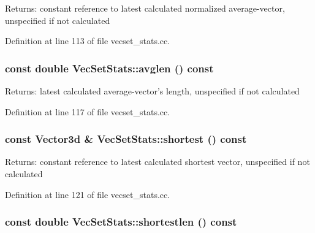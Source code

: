 \begin{Desc}
\item[Returns:]constant reference to latest calculated normalized average-vector, unspecified if not calculated \end{Desc}


Definition at line 113 of file vecset\_\-stats.cc.\hypertarget{class_vec_set_stats_823c982b6d964b040bcd0afe5623ae5a}{
\subsubsection[avglen]{\setlength{\rightskip}{0pt plus 5cm}const double VecSetStats::avglen () const}}
\label{class_vec_set_stats_823c982b6d964b040bcd0afe5623ae5a}


\begin{Desc}
\item[Returns:]latest calculated average-vector's length, unspecified if not calculated \end{Desc}


Definition at line 117 of file vecset\_\-stats.cc.\hypertarget{class_vec_set_stats_6fb6a02bbdabbcfb815cdb591c850030}{
\subsubsection[shortest]{\setlength{\rightskip}{0pt plus 5cm}const Vector3d \& VecSetStats::shortest () const}}
\label{class_vec_set_stats_6fb6a02bbdabbcfb815cdb591c850030}


\begin{Desc}
\item[Returns:]constant reference to latest calculated shortest vector, unspecified if not calculated \end{Desc}


Definition at line 121 of file vecset\_\-stats.cc.\hypertarget{class_vec_set_stats_b91c568dbcd9cd91a16f2610af2b66aa}{
\subsubsection[shortestlen]{\setlength{\rightskip}{0pt plus 5cm}const double VecSetStats::shortestlen () const}}
\label{class_vec_set_stats_b91c568dbcd9cd91a16f2610af2b66aa}


